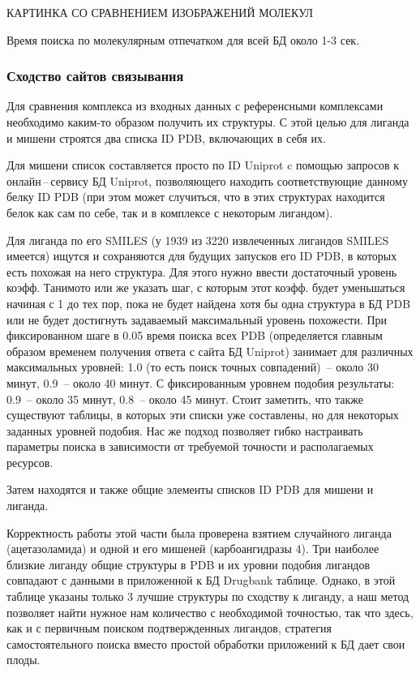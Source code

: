 \documentclass[a4paper,14pt]{article}         %
\begin{document}
\color{orange} КАРТИНКА СО СРАВНЕНИЕМ ИЗОБРАЖЕНИЙ МОЛЕКУЛ
\color{black}

Время поиска по молекулярным отпечатком для всей БД около 1-3 сек.
\subsubsection{Сходство сайтов связывания}
Для сравнения комплекса из входных данных с референсными комплексами необходимо каким-то образом получить их структуры. С этой целью для лиганда и мишени строятся два списка ID PDB, включающих в себя их. 

Для мишени список составляется просто по ID Uniprot c помощью запросов к онлайн\,--\,сервису БД Uniprot, позволяющего находить соответствующие данному белку ID PDB (при этом может случиться, что в этих структурах находится белок как сам по себе, так и в комплексе с некоторым лигандом). 

Для лиганда по его SMILES (у 1939 из 3220 извлеченных лигандов SMILES имеется) ищутся и сохраняются для будущих запусков его ID PDB, в которых есть похожая на него структура. Для этого нужно ввести достаточный уровень коэфф. Танимото или же указать шаг, с которым этот коэфф. будет уменьшаться начиная с 1 до тех пор, пока не будет найдена хотя бы одна структура в БД PDB или не будет достигнуть задаваемый максимальный уровень похожести. При фиксированном шаге в 0.05 время поиска всех PDB (определяется главным образом временем получения ответа с сайта БД Uniprot) занимает для различных максимальных уровней: 1.0 (то есть поиск точных совпадений)~-- около 30 минут, 0.9~-- около 40 минут. С фиксированным уровнем подобия результаты: 0.9~-- около 35 минут, 0.8~-- около 45 минут. Стоит заметить, что также существуют таблицы, в которых эти списки уже составлены, но для некоторых заданных уровней подобия. Нас же подход позволяет гибко настраивать параметры поиска в зависимости от требуемой точности и располагаемых ресурсов.

Затем находятся и также общие элементы списков ID PDB для мишени и лиганда.

Корректность работы этой части была проверена взятием случайного лиганда (ацетазоламида) и одной и его мишеней (карбоангидразы 4). Три наиболее близкие лиганду общие структуры в PDB и их уровни подобия лигандов совпадают с данными в приложенной к БД Drugbank таблице. Однако, в этой таблице указаны только 3 лучшие структуры по сходству к лиганду, а наш метод позволяет найти нужное нам количество с необходимой точностью, так что здесь, как и с первичным поиском подтвержденных лигандов, стратегия самостоятельного поиска вместо простой обработки приложений к БД дает свои плоды.
\end{document}
